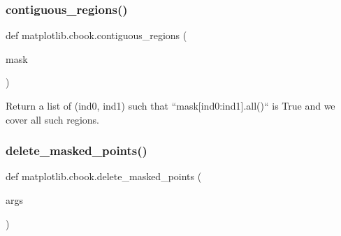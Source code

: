  \mbox{\label{namespacematplotlib_1_1cbook_aee5e1f5850d10d2ac4ce893123eadf2d}} 
\subsubsection{\texorpdfstring{contiguous\+\_\+regions()}{contiguous\_regions()}}
{\footnotesize\ttfamily def matplotlib.\+cbook.\+contiguous\+\_\+regions (\begin{DoxyParamCaption}\item[{}]{mask }\end{DoxyParamCaption})}

\begin{DoxyVerb}Return a list of (ind0, ind1) such that ``mask[ind0:ind1].all()`` is
True and we cover all such regions.
\end{DoxyVerb}
 \mbox{\label{namespacematplotlib_1_1cbook_aaef0de8c17f94f25ceba253a5abbc33e}} 
\subsubsection{\texorpdfstring{delete\+\_\+masked\+\_\+points()}{delete\_masked\_points()}}
{\footnotesize\ttfamily def matplotlib.\+cbook.\+delete\+\_\+masked\+\_\+points (\begin{DoxyParamCaption}\item[{}]{args }\end{DoxyParamCaption})}


